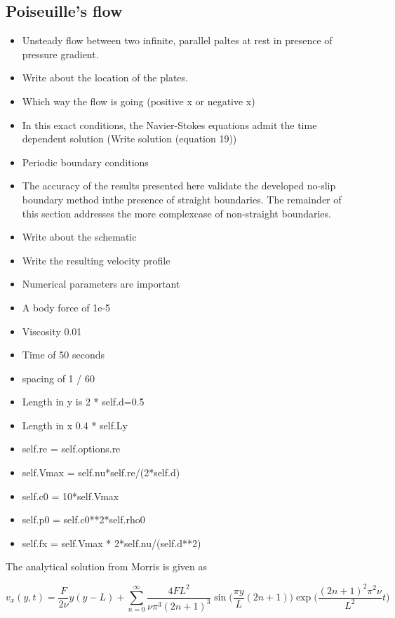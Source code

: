 \documentclass[preprint,12pt]{elsarticle}
\begin{document}
\FloatBarrier%
\subsection{Poiseuille's flow}
\label{sec:poiseuille_flow}

\begin{itemize}
\item Unsteady flow between two infinite, parallel paltes at rest in presence
  of pressure gradient.
\item Write about the location of the plates.
\item Which way the flow is going (positive x or negative x)
\item In this exact conditions, the Navier-Stokes equations admit the time
  dependent solution (Write solution (equation 19))
\item Periodic boundary conditions
\item The accuracy of the results presented here validate the developed
  no-slip boundary method inthe presence of straight boundaries.  The
  remainder of this section addresses the more complexcase of non-straight
  boundaries.
\item Write about the schematic
\item Write the resulting velocity profile
\item Numerical parameters are important
\item A body force of 1e-5
\item Viscosity 0.01
\item Time of 50 seconds
\item spacing of 1 / 60
\item Length in y is 2 * self.d=0.5
\item Length in x 0.4 * self.Ly
\item self.re = self.options.re
\item self.Vmax = self.nu*self.re/(2*self.d)
\item self.c0 = 10*self.Vmax
\item self.p0 = self.c0**2*self.rho0
\item self.fx = self.Vmax * 2*self.nu/(self.d**2)
\end{itemize}

The analytical solution from Morris is given as


\begin{equation}
  \label{eq:sph-discretization-continuity}
  v_x(y, t) = \frac{F}{2 \nu}y(y - L) + \sum_{n=0}^{\infty}\frac{4FL^2}{\nu \pi^3 (2n + 1)^3} \sin\bigg(\frac{\pi y}{L} (2 n + 1) \bigg) \exp\bigg(\frac{ (2 n + 1)^2 \pi^2 \nu}{L^2} t\bigg)
\end{equation}
\end{document}
